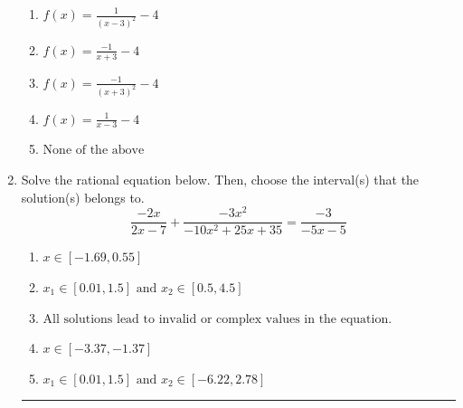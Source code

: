 \documentclass[14pt]{extbook}
\newcommand{\litem}[1]{\item#1\hspace*{-1cm}\rule{\textwidth}{0.4pt}}
\begin{document}
\begin{enumerate}
{\begin{center}
\end{center}
\begin{enumerate}[label=\Alph*.]
\item \( f(x) = \frac{1}{(x - 3)^2} - 4 \)
\item \( f(x) = \frac{-1}{x + 3} - 4 \)
\item \( f(x) = \frac{-1}{(x + 3)^2} - 4 \)
\item \( f(x) = \frac{1}{x - 3} - 4 \)
\item \( \text{None of the above} \)

\end{enumerate} }
\litem{
Solve the rational equation below. Then, choose the interval(s) that the solution(s) belongs to.\[ \frac{-2x}{2x -7} + \frac{-3x^{2}}{-10x^{2} +25 x + 35} = \frac{-3}{-5x -5} \]\begin{enumerate}[label=\Alph*.]
\item \( x \in [-1.69,0.55] \)
\item \( x_1 \in [0.01, 1.5] \text{ and } x_2 \in [0.5,4.5] \)
\item \( \text{All solutions lead to invalid or complex values in the equation.} \)
\item \( x \in [-3.37,-1.37] \)
\item \( x_1 \in [0.01, 1.5] \text{ and } x_2 \in [-6.22,2.78] \)

\end{enumerate} }
\end{enumerate}
\end{document}
